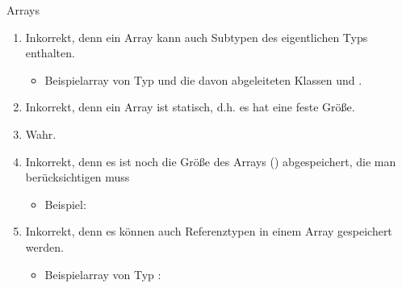 \documentclass{../preamble}
\begin{document}
\begin{task}[credit = \stars{1}{3}]{Arrays}
    \begin{solution}
        \begin{enumerate}[label = (\arabic*)]
            \item Inkorrekt, denn ein Array kann auch Subtypen des eigentlichen Typs enthalten.
                  \begin{itemize}
                      \item Beispielarray von Typ  und die davon abgeleiteten Klassen  und .
                            
                  \end{itemize}
            \item Inkorrekt, denn ein Array ist statisch, d.h. es hat eine feste Größe.
            \item Wahr.
            \item Inkorrekt, denn es ist noch die Größe des Arrays () abgespeichert, die man berücksichtigen muss
                  \begin{itemize}
                      \item Beispiel:
                            
                  \end{itemize}
            \item Inkorrekt, denn es können auch Referenztypen in einem Array gespeichert werden.
                  \begin{itemize}
                      \item Beispielarray von Typ :
                            
                  \end{itemize}
        \end{enumerate}
        
    \end{solution}
\end{task}

\clearpage
\end{document}

